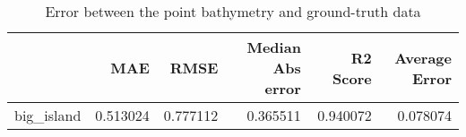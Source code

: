 \begin{table}[h!]
\caption{Error between the point bathymetry and ground-truth data}
\label{tab:big_island_lidar_error}
\begin{tabular}{lrrrrr}
\toprule
 & MAE & RMSE & Median Abs error & R2 Score & Average Error \\
\midrule
big_island & 0.513024 & 0.777112 & 0.365511 & 0.940072 & 0.078074 \\
\bottomrule
\end{tabular}
\end{table}
